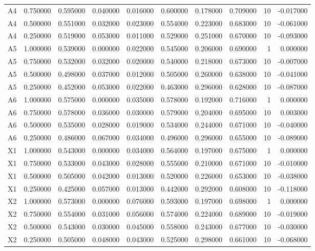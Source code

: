 \begin{table}
\begin{tabular}{lrrrrrrrrr}
A4 & 0.750000 & 0.595000 & 0.040000 & 0.016000 & 0.600000 & 0.178000 & 0.709000 & 10 & -0.017000 \\
A4 & 0.500000 & 0.551000 & 0.032000 & 0.023000 & 0.554000 & 0.223000 & 0.683000 & 10 & -0.061000 \\
A4 & 0.250000 & 0.519000 & 0.053000 & 0.011000 & 0.529000 & 0.251000 & 0.670000 & 10 & -0.093000 \\
A5 & 1.000000 & 0.539000 & 0.000000 & 0.022000 & 0.545000 & 0.206000 & 0.690000 & 1 & 0.000000 \\
A5 & 0.750000 & 0.532000 & 0.032000 & 0.020000 & 0.540000 & 0.218000 & 0.673000 & 10 & -0.007000 \\
A5 & 0.500000 & 0.498000 & 0.037000 & 0.012000 & 0.505000 & 0.260000 & 0.638000 & 10 & -0.041000 \\
A5 & 0.250000 & 0.452000 & 0.053000 & 0.022000 & 0.463000 & 0.296000 & 0.628000 & 10 & -0.087000 \\
A6 & 1.000000 & 0.575000 & 0.000000 & 0.035000 & 0.578000 & 0.192000 & 0.716000 & 1 & 0.000000 \\
A6 & 0.750000 & 0.578000 & 0.036000 & 0.030000 & 0.579000 & 0.204000 & 0.695000 & 10 & 0.003000 \\
A6 & 0.500000 & 0.535000 & 0.028000 & 0.019000 & 0.534000 & 0.244000 & 0.671000 & 10 & -0.040000 \\
A6 & 0.250000 & 0.486000 & 0.067000 & 0.034000 & 0.496000 & 0.296000 & 0.655000 & 10 & -0.089000 \\
X1 & 1.000000 & 0.543000 & 0.000000 & 0.034000 & 0.564000 & 0.197000 & 0.675000 & 1 & 0.000000 \\
X1 & 0.750000 & 0.533000 & 0.043000 & 0.028000 & 0.555000 & 0.210000 & 0.671000 & 10 & -0.010000 \\
X1 & 0.500000 & 0.505000 & 0.042000 & 0.013000 & 0.520000 & 0.226000 & 0.653000 & 10 & -0.038000 \\
X1 & 0.250000 & 0.425000 & 0.057000 & 0.013000 & 0.442000 & 0.292000 & 0.608000 & 10 & -0.118000 \\
X2 & 1.000000 & 0.573000 & 0.000000 & 0.076000 & 0.593000 & 0.197000 & 0.698000 & 1 & 0.000000 \\
X2 & 0.750000 & 0.554000 & 0.031000 & 0.056000 & 0.574000 & 0.224000 & 0.689000 & 10 & -0.019000 \\
X2 & 0.500000 & 0.543000 & 0.030000 & 0.045000 & 0.558000 & 0.243000 & 0.677000 & 10 & -0.030000 \\
X2 & 0.250000 & 0.505000 & 0.048000 & 0.043000 & 0.525000 & 0.298000 & 0.661000 & 10 & -0.068000 \\

\end{tabular}
\end{table}
